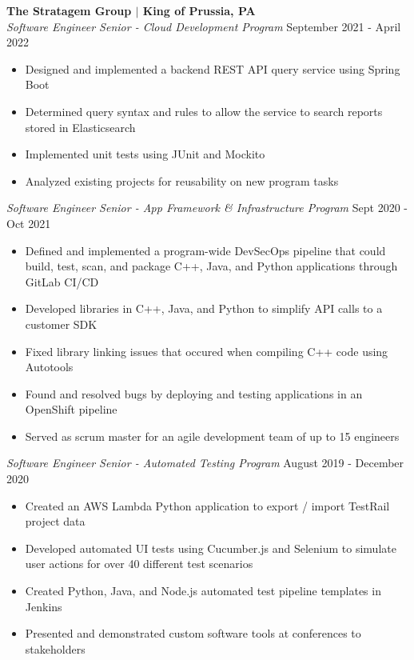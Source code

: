\documentclass[line,resmargin]{res}
\begin{document}
\begin{resume}
\textbf{The Stratagem Group $|$ King of Prussia, PA} \\
{\sl Software Engineer Senior - Cloud Development Program} \hfill September 2021 - April 2022
	\begin{itemize} \itemsep -2pt %
		\item Designed and implemented a backend REST API query service using Spring Boot
		\item Determined query syntax and rules to allow the service to search reports stored in Elasticsearch\
		\item Implemented unit tests using JUnit and Mockito
		\item Analyzed existing projects for reusability on new program tasks
	\end{itemize}

{\sl Software Engineer Senior - App Framework \& Infrastructure Program} \hfill Sept 2020 - Oct 2021
	\begin{itemize} \itemsep -2pt
		\item Defined and implemented a program-wide DevSecOps pipeline that could build, test, scan, and package C++, Java, and Python applications through GitLab CI/CD
		\item Developed libraries in C++, Java, and Python to simplify API calls to a customer SDK
		\item Fixed library linking issues that occured when compiling C++ code using Autotools
		\item Found and resolved bugs by deploying and testing applications in an OpenShift pipeline
		\item Served as scrum master for an agile development team of up to 15 engineers
	\end{itemize}

{\sl Software Engineer Senior - Automated Testing Program} \hfill August 2019 - December 2020
	\begin{itemize} \itemsep -2pt
		\item Created an AWS Lambda Python application to export / import TestRail project data
		\item Developed automated UI tests using Cucumber.js and Selenium to simulate user actions for over 40 different test scenarios
		\item Created Python, Java, and Node.js automated test pipeline templates in Jenkins
		\item Presented and demonstrated custom software tools at conferences to stakeholders
	\end{itemize}
	

\end{resume}
\end{document}
